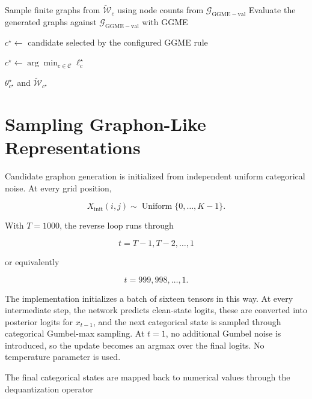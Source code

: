 \begin{algorithm}[H]
\begin{algorithmic}[1]
    \EndFor
    
    
            \State Sample finite graphs from
                   $\widetilde{\mathcal{W}}_c$
                   using node counts from
                   $\mathcal{G}_{\mathrm{GGME-val}}$
            \State Evaluate the generated graphs against
                   $\mathcal{G}_{\mathrm{GGME-val}}$
                   with GGME
        \EndFor
    
        \State $c^\star \gets$
               candidate selected by the configured GGME rule
    
    \Else
    
        \State $c^\star
               \gets
               \arg\min_{c\in\mathcal{C}}\ell_c^\star$
    
    \EndIf
    
    \State \Return
           $\theta_{c^\star}^\star$
           and
           $\widetilde{\mathcal{W}}_{c^\star}$
    
    \end{algorithmic}
\end{algorithm}

\section{Sampling Graphon-Like Representations}
\label{sec:method_d3pm_sampling}

Candidate graphon generation is initialized from independent uniform categorical noise. At every grid position,

\[
X_{\mathrm{init}}(i,j)
\sim
\operatorname{Uniform}
\{0,\ldots,K-1\}.
\]

With \(T=1000\), the reverse loop runs through

\[
t=T-1,T-2,\ldots,1
\]

or equivalently

\[
t=999,998,\ldots,1.
\]

The implementation initializes a batch of sixteen tensors in this way. At every intermediate step, the network predicts clean-state logits, these are converted into posterior logits for \(x_{t-1}\), and the next categorical state is sampled through categorical Gumbel-max sampling. At \(t=1\), no additional Gumbel noise is introduced, so the update becomes an argmax over the final logits. No temperature parameter is used.

The final categorical states are mapped back to numerical values through the dequantization operator

